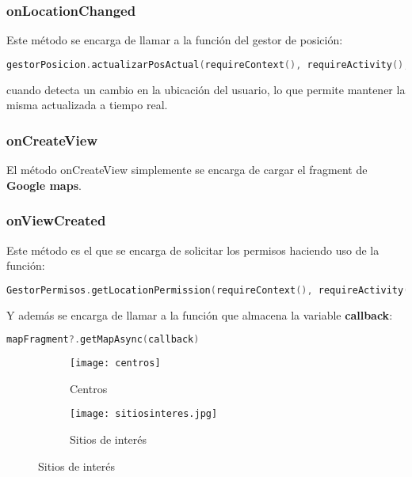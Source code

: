 \subsubsection{onLocationChanged}
Este método se encarga de llamar a la función del gestor de posición:

\begin{lstlisting}[language=Kotlin]
gestorPosicion.actualizarPosActual(requireContext(), requireActivity(), it)
\end{lstlisting}

cuando detecta un cambio en la ubicación del usuario, lo que permite mantener la misma actualizada a tiempo real.

\subsubsection{onCreateView}
El método onCreateView simplemente se encarga de cargar el fragment de \textbf{Google maps}.

\subsubsection{onViewCreated}
Este método es el que se encarga de solicitar los permisos haciendo uso de la función:

\begin{lstlisting}[language=Kotlin]
GestorPermisos.getLocationPermission(requireContext(), requireActivity())
\end{lstlisting}

Y además se encarga de llamar a la función que almacena la variable \textbf{callback}:

\begin{lstlisting}[language=Kotlin]
mapFragment?.getMapAsync(callback)
\end{lstlisting}

\begin{figure}[H]
\begin{subfigure}{0.5\textwidth}
  \centering
  \texttt{[image: centros]}
  \caption{Centros}
  \label{fig:sub-first}
\end{subfigure}
\begin{subfigure}{0.5\textwidth}
  \centering
  \texttt{[image: sitiosinteres.jpg]}
  \caption{Sitios de interés}
  \label{fig:sub-second}
\end{subfigure}
\end{figure}

